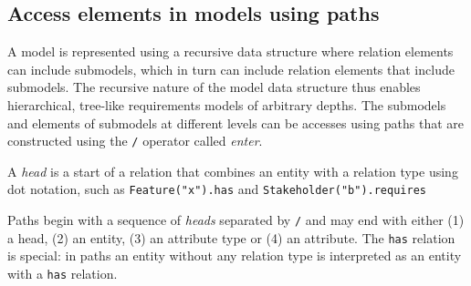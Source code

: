 \documentclass[11pt]{article}
\begin{document}
\subsection{Access elements in models using paths}

A model is represented using a recursive data structure where relation elements can include submodels, which in turn can include relation elements that include submodels. The recursive nature of the model data structure thus enables hierarchical, tree-like requirements models of arbitrary depths. The submodels and elements of submodels at different levels can be accesses using paths that are constructed using the \verb+/+ operator called {\it enter}. 

A {\it head} is a start of a relation that combines an entity with a relation type using dot notation, such as  
\verb+Feature("x").has+ and \verb+Stakeholder("b").requires+  

Paths begin with a sequence of {\it heads} separated by \verb+/+ and may end with either (1) a head, (2) an entity, (3) an attribute type or (4) an attribute. The \verb+has+ relation is special: in paths an entity without any relation type is interpreted as an entity with a \verb+has+ relation. 
\end{document}
